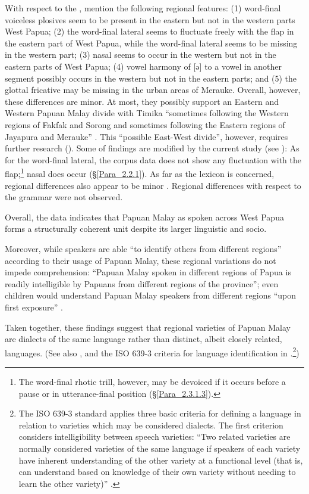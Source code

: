 With respect to the , \citet[24–44]{Scott.2008} mention the following regional features: (1) word-final voiceless plosives seem to be present in the eastern but not in the western parts West Papua; (2) the word-final lateral seems to fluctuate freely with the flap in the eastern part of West Papua, while the word-final lateral seems to be missing in the western part; (3) nasal  seems to occur in the western but not in the eastern parts of West Papua; (4) vowel harmony of [ə] to a vowel in another segment possibly occurs in the western but not in the eastern parts; and (5) the glottal fricative may be missing in the urban areas of Merauke. Overall, however, these differences are minor. At most, they possibly support an Eastern and Western Papuan Malay divide with Timika  ``sometimes following the Western regions of Fakfak and Sorong and sometimes following the Eastern regions of Jayapura and Merauke'' \citep[43]{Scott.2008}. This  ``possible East-West divide'', however, requires further research (\citeyear*[44]{Scott.2008}). Some of {} findings are modified by the current study (see ): As for the word-final lateral, the corpus data does not show any fluctuation with the flap;\footnote{The word-final rhotic trill, however, may be devoiced if it occurs before a pause or in utterance-final position (§\ref{Para_2.3.1.3}).} nasal  does occur (§\ref{Para_2.2.1}). As far as the lexicon is concerned, regional differences also appear to be minor \citep[46, 96, 99]{Scott.2008}. Regional differences with respect to the grammar were not observed.



Overall, the data indicates that Papuan Malay as spoken across West Papua forms a structurally coherent unit despite its larger linguistic and socio.



Moreover, while speakers are able  ``to identify others from different regions'' according to their usage of Papuan Malay, these regional variations do not impede comprehension:  ``Papuan Malay spoken in different regions of Papua is readily intelligible by Papuans from different regions of the province''; even children would understand Papuan Malay speakers from different regions  ``upon first exposure'' \citep[18]{Scott.2008}.



Taken together, these findings suggest that regional varieties of Papuan Malay are dialects of the same language rather than distinct, albeit closely related, languages. (See also \citealt[3]{Anderbeck.2007}, and the ISO 639-3 criteria for language identification in \citealt{Lewis.2016b}.\footnote{The ISO 639-3 standard applies three basic criteria for defining a language in relation to varieties which may be considered dialects. The first criterion considers intelligibility between speech varieties:  ``Two related varieties are normally considered varieties of the same language if speakers of each variety have inherent understanding of the other variety at a functional level (that is, can understand based on knowledge of their own variety without needing to learn the other variety)'' \citep{Lewis.2016}.})


